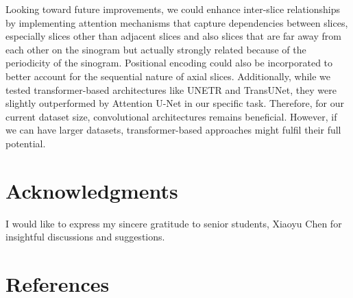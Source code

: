 \documentclass[12pt]{iopart}
\begin{document}
Looking toward future improvements, we could enhance inter-slice relationships by implementing attention mechanisms that capture dependencies between slices, especially slices other than adjacent slices and also slices that are far away from each other on the sinogram but actually strongly related because of the periodicity of the sinogram. Positional encoding could also be incorporated to better account for the sequential nature of axial slices. Additionally, while we tested transformer-based architectures like UNETR and TransUNet, they were slightly outperformed by Attention U-Net in our specific task. 
Therefore,  for our current dataset size, convolutional architectures remains beneficial. However, if we can have larger datasets, transformer-based approaches might fulfil their full potential.




\section{Acknowledgments}
I would like to express my sincere gratitude to senior students, Xiaoyu Chen for insightful discussions and suggestions.

\section*{References}

\nocite{*}


\end{document}
